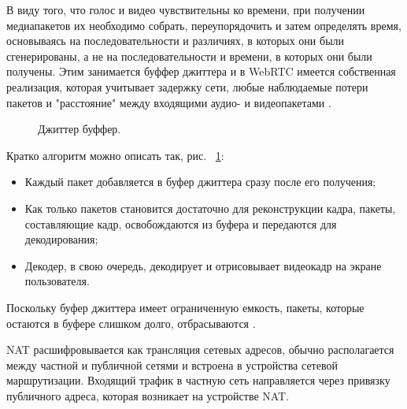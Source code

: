 В виду того, что голос и видео чувствительны ко времени, при получении медиапакетов их необходимо собрать, переупорядочить и затем определять время, основываясь на последовательности и различиях, в которых они были сгенерированы, а не на последовательности и времени, в которых они были получены. Этим занимается буффер джиттера и в WebRTC имеется собственная реализация, которая учитывает задержку сети, любые наблюдаемые потери пакетов и "расстояние" между входящими аудио- и видеопакетами \cite{v12}.

\begin{figure}[ht]
\begin{center}

\caption{
\label{jitter-buffer}
     Джиттер буффер.}
\end {center}
\end {figure}

Кратко алгоритм можно описать так, рис. ~\ref{jitter-buffer}:
\begin{itemize}
	\item[1.] Каждый пакет добавляется в буфер джиттера сразу после его получения;
	\item[2.] Как только пакетов становится достаточно для реконструкции кадра, пакеты, составляющие кадр, освобождаются из буфера и передаются для декодирования;
        \item[3.] Декодер, в свою очередь, декодирует и отрисовывает видеокадр на экране пользователя.
\end{itemize}

Поскольку буфер джиттера имеет ограниченную емкость, пакеты, которые остаются в буфере слишком долго, отбрасываются \cite{v13}.


NAT расшифровывается как трансляция сетевых адресов, обычно располагается между частной и публичной сетями и встроена в устройства сетевой маршрутизации. Входящий трафик в частную сеть направляется через привязку публичного адреса, которая возникает на устройстве NAT.


